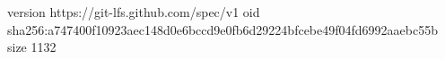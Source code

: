 version https://git-lfs.github.com/spec/v1
oid sha256:a747400f10923aec148d0e6bccd9e0fb6d29224bfcebe49f04fd6992aaebc55b
size 1132
